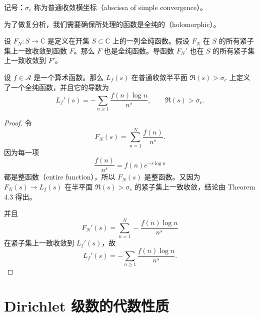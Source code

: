 记号：$\sigma_c$ 称为普通收敛横坐标（abscissa of simple convergence）。

\begin{center}
\end{center}

为了做复分析，我们需要确保所处理的函数是全纯的（holomorphic）。

\begin{theorem}[原文 Theorem 4.3]
	设 $F_N:S\to\mathbb C$ 是定义在开集 $S\subset\mathbb C$ 上的一列全纯函数。假设 $F_N$ 在 $S$ 的所有紧子集上一致收敛到函数 $F$。那么 $F$ 也是全纯函数。导函数 $F_N'$ 也在 $S$ 的所有紧子集上一致收敛到 $F'$。
\end{theorem}

\begin{theorem}
	设 $f\in\mathcal A$ 是一个算术函数。那么 $L_f(s)$ 在普通收敛半平面 $\Re(s)>\sigma_c$ 上定义了一个全纯函数，并且它的导数为
	\[
		L_f'(s)=-\sum_{n\geq 1}\frac{f(n)\log n}{n^s},
		\qquad \Re(s)>\sigma_c.
	\]
\end{theorem}

\begin{proof}
	令
	\[
		F_N(s)=\sum_{n=1}^N\frac{f(n)}{n^s}.
	\]
	因为每一项
	\[
		\frac{f(n)}{n^s}=f(n)e^{-s\log n}
	\]
	都是整函数（entire function），所以 $F_N(s)$ 是整函数。又因为 $F_N(s)\to L_f(s)$ 在半平面 $\Re(s)>\sigma_c$ 的紧子集上一致收敛，结论由 Theorem 4.3 得出。

	并且
	\[
		F_N'(s)=\sum_{n=1}^N-\frac{f(n)\log n}{n^s}
	\]
	在紧子集上一致收敛到 $L_f'(s)$，故
	\[
		L_f'(s)=-\sum_{n\geq 1}\frac{f(n)\log n}{n^s}.
	\]
\end{proof}

\section{Dirichlet 级数的代数性质}

